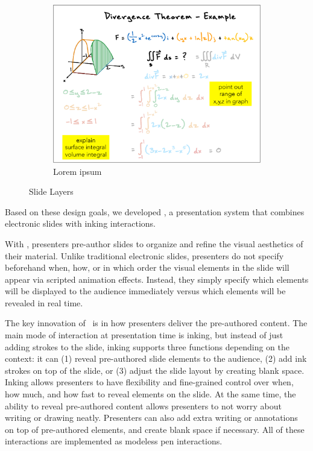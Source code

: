 \begin{figure}[ht!]
\begin{subfigure}[t]{0.32\textwidth}
    \end{subfigure}
    ~
        \begin{subfigure}[t]{0.32\textwidth}
        \centering
        \includegraphics[width=1\columnwidth]{figures/videoslide3}
        \caption{Lorem ipsum}
    \end{subfigure}
    \caption{Slide Layers}
\end{figure}

Based on these design goals, we developed \interface, a presentation system that combines electronic slides with inking interactions. 

With \interface, presenters pre-author slides to organize and refine the visual aesthetics of their material.
%
Unlike traditional electronic slides, presenters do not specify beforehand when, how, or in which order the visual elements in the slide will appear via scripted animation effects. Instead, they simply specify which elements will be displayed to the audience immediately versus which elements will be revealed in real time. 

The key innovation of \interface\ is in how presenters deliver the pre-authored content.  The main mode of interaction at presentation time is inking, but instead of just adding strokes to the slide, inking supports three functions depending on the context: it can (1) reveal pre-authored slide elements to the audience, (2) add ink strokes on top of the slide, or (3) adjust the slide layout by creating blank space. Inking allows presenters to have flexibility and fine-grained control over when, how much, and how fast to reveal elements on the slide.
%
At the same time, the ability to reveal pre-authored content allows presenters to not worry about writing or drawing neatly.
%
Presenters can also add extra writing or annotations on top of pre-authored elements, and create blank space if necessary. 
%
All of these interactions are implemented as modeless pen interactions.

